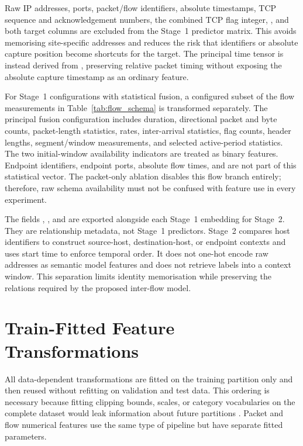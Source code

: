 \documentclass[11pt,fleqn]{report}
\begin{document}
Raw IP addresses, ports, packet/flow identifiers, absolute timestamps, TCP sequence and acknowledgement numbers, the combined TCP flag integer, , and both target columns are excluded from the Stage~1 predictor matrix. This avoids memorising site-specific addresses and reduces the risk that identifiers or absolute capture position become shortcuts for the target. The principal time tensor is instead derived from , preserving relative packet timing without exposing the absolute capture timestamp as an ordinary feature.

For Stage~1 configurations with statistical fusion, a configured subset of the flow measurements in Table~\ref{tab:flow_schema} is transformed separately. The principal fusion configuration includes duration, directional packet and byte counts, packet-length statistics, rates, inter-arrival statistics, flag counts, header lengths, segment/window measurements, and selected active-period statistics. The two initial-window availability indicators are treated as binary features. Endpoint identifiers, endpoint ports, absolute flow times, and  are not part of this statistical vector. The packet-only ablation disables this flow branch entirely; therefore, raw schema availability must not be confused with feature use in every experiment.

The fields , , and  are exported alongside each Stage~1 embedding for Stage~2. They are relationship metadata, not Stage~1 predictors. Stage~2 compares host identifiers to construct source-host, destination-host, or endpoint contexts and uses start time to enforce temporal order. It does not one-hot encode raw addresses as semantic model features and does not retrieve labels into a context window. This separation limits identity memorisation while preserving the relations required by the proposed inter-flow model.

\section{Train-Fitted Feature Transformations}
\label{subsec:feature_transformations}

All data-dependent transformations are fitted on the training partition only and then reused without refitting on validation and test data. This ordering is necessary because fitting clipping bounds, scales, or category vocabularies on the complete dataset would leak information about future partitions \cite{Arp2022DosDonts}. Packet and flow numerical features use the same type of pipeline but have separate fitted parameters.
\end{document}

